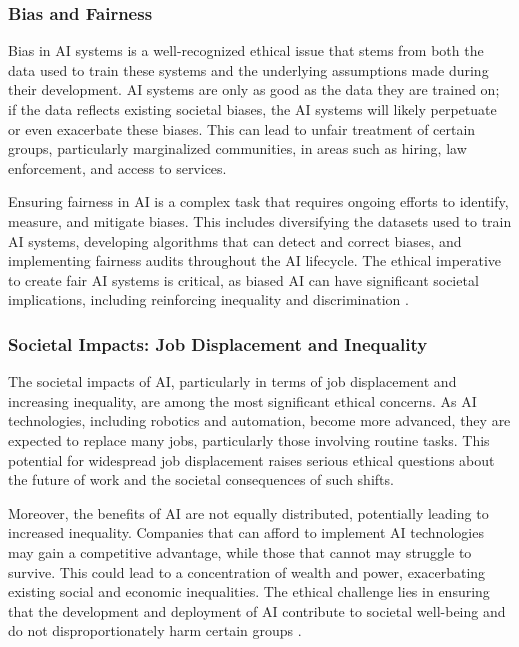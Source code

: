 \subsubsection{Bias and Fairness}

Bias in AI systems is a well-recognized ethical issue that stems from both the data used to train these systems and the underlying assumptions made during their development. AI systems are only as good as the data they are trained on; if the data reflects existing societal biases, the AI systems will likely perpetuate or even exacerbate these biases. This can lead to unfair treatment of certain groups, particularly marginalized communities, in areas such as hiring, law enforcement, and access to services.

Ensuring fairness in AI is a complex task that requires ongoing efforts to identify, measure, and mitigate biases. This includes diversifying the datasets used to train AI systems, developing algorithms that can detect and correct biases, and implementing fairness audits throughout the AI lifecycle. The ethical imperative to create fair AI systems is critical, as biased AI can have significant societal implications, including reinforcing inequality and discrimination \cite{huang2022overview}.

\subsubsection{Societal Impacts: Job Displacement and Inequality}

The societal impacts of AI, particularly in terms of job displacement and increasing inequality, are among the most significant ethical concerns. As AI technologies, including robotics and automation, become more advanced, they are expected to replace many jobs, particularly those involving routine tasks. This potential for widespread job displacement raises serious ethical questions about the future of work and the societal consequences of such shifts.

Moreover, the benefits of AI are not equally distributed, potentially leading to increased inequality. Companies that can afford to implement AI technologies may gain a competitive advantage, while those that cannot may struggle to survive. This could lead to a concentration of wealth and power, exacerbating existing social and economic inequalities. The ethical challenge lies in ensuring that the development and deployment of AI contribute to societal well-being and do not disproportionately harm certain groups \cite{huang2022overview}.

